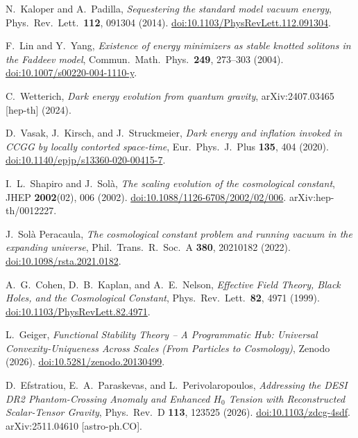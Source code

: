 \documentclass[12pt,a4paper]{article}
\theoremstyle{definition}
\theoremstyle{plain}
\theoremstyle{remark}
\begin{document}
\begin{thebibliography}{99}
N.~Kaloper and A.~Padilla,
\textit{Sequestering the standard model vacuum energy},
Phys.\ Rev.\ Lett.\ \textbf{112}, 091304 (2014).
\href{https://doi.org/10.1103/PhysRevLett.112.091304}{doi:10.1103/PhysRevLett.112.091304}.

F.~Lin and Y.~Yang,
\textit{Existence of energy minimizers as stable knotted solitons in the Faddeev model},
Commun.\ Math.\ Phys.\ \textbf{249}, 273--303 (2004).
\href{https://doi.org/10.1007/s00220-004-1110-y}{doi:10.1007/s00220-004-1110-y}.


C.~Wetterich,
\textit{Dark energy evolution from quantum gravity},
arXiv:2407.03465 [hep-th] (2024).

D.~Vasak, J.~Kirsch, and J.~Struckmeier,
\textit{Dark energy and inflation invoked in CCGG by locally contorted space-time},
Eur.\ Phys.\ J.\ Plus \textbf{135}, 404 (2020).
\href{https://doi.org/10.1140/epjp/s13360-020-00415-7}{doi:10.1140/epjp/s13360-020-00415-7}.

I.~L.~Shapiro and J.~Solà,
\textit{The scaling evolution of the cosmological constant},
JHEP \textbf{2002}(02), 006 (2002).
\href{https://doi.org/10.1088/1126-6708/2002/02/006}{doi:10.1088/1126-6708/2002/02/006}.
arXiv:hep-th/0012227.

J.~Solà Peracaula,
\textit{The cosmological constant problem and running vacuum in the expanding universe},
Phil.\ Trans.\ R.\ Soc.\ A \textbf{380}, 20210182 (2022).
\href{https://doi.org/10.1098/rsta.2021.0182}{doi:10.1098/rsta.2021.0182}.

A.~G.~Cohen, D.~B.~Kaplan, and A.~E.~Nelson,
\textit{Ef{\-}fec{\-}ti{\-}ve Field Theo{\-}ry, Black Holes, and the Cos{\-}mo{\-}lo{\-}gi{\-}cal Con{\-}stant},
Phys.\ Rev.\ Lett.\ \textbf{82}, 4971 (1999).
\href{https://doi.org/10.1103/PhysRevLett.82.4971}{doi:10.1103/PhysRevLett.82.4971}.

L.~Geiger,
\textit{Func{\-}tio{\-}nal Sta{\-}bi{\-}li{\-}ty Theo{\-}ry -- A Pro{\-}gram{\-}ma{\-}tic Hub: Uni{\-}ver{\-}sal Con{\-}ve{\-}xi{\-}ty-Unique{\-}ness Across Scales (From Par{\-}ti{\-}cles to Cos{\-}mo{\-}lo{\-}gy)},
Zenodo (2026).
\href{https://doi.org/10.5281/zenodo.20130499}{doi:10.5281/zenodo.20130499}.

D.~Efstratiou, E.~A.~Paraskevas, and L.~Perivolaropoulos,
\textit{Addressing the DESI DR2 Phantom-Crossing Anomaly and Enhanced $H_0$ Tension with Reconstructed Scalar-Tensor Gravity},
Phys.\ Rev.\ D \textbf{113}, 123525 (2026).
\href{https://doi.org/10.1103/zdcg-4sdf}{doi:10.1103/zdcg-4sdf}.
arXiv:2511.04610 [astro-ph.CO].


\end{thebibliography}
\end{document}
